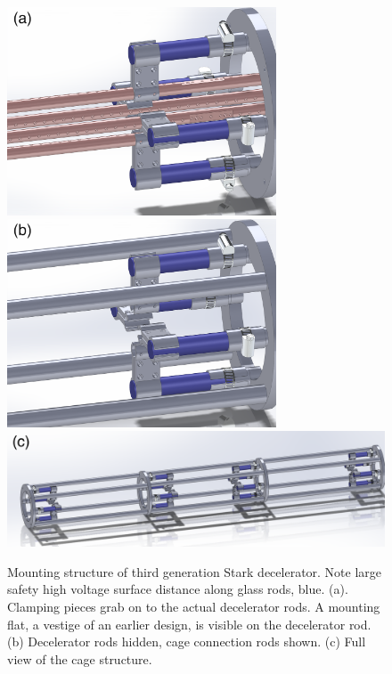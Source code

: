 \begin{figure}[t!]
\centering
\includegraphics[width=8cm]{Slowing/MountingCageSystem1.png}
\includegraphics[width=8cm]{Slowing/MountingCageSystem2.png}\\
\includegraphics[width=\linewidth]{Slowing/MountingCageSystem3.png}
\caption[Decelerator Mounting Structure]{\label{fig:decelmountingimages}
Mounting structure of third generation Stark decelerator. Note large safety high voltage surface distance along glass rods, blue. (a). Clamping pieces grab on to the actual decelerator rods. A mounting flat, a vestige of an earlier design, is visible on the decelerator rod. (b) Decelerator rods hidden, cage connection rods shown. (c) Full view of the cage structure.}
\end{figure}


